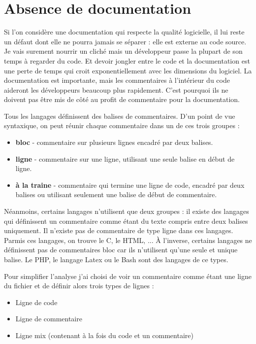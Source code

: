 \documentclass[10pt,a4paper,twoside, openany]{report}
\begin{document}
\section{Absence de documentation}

Si l'on consid\`ere une documentation qui respecte la qualit\'e logicielle, il lui reste un d\'efaut dont elle ne pourra jamais se s\'eparer : elle est externe au code source. Je vais surement nourrir un clich\'e mais un d\'eveloppeur passe la plupart de son temps \`a regarder du code. Et devoir jongler entre le code et la documentation est une perte de temps qui croit exponentiellement avec les dimensions du logiciel. La documentation est importante, mais les commentaires \`a l'int\'erieur du code aideront les d\'eveloppeurs beaucoup plus rapidement. C'est pourquoi ils ne doivent pas \^etre mis de c\^ot\'e au profit de commentaire pour la documentation.\newline

Tous les langages d\'efinissent des balises de commentaires. D'un point de vue syntaxique, on peut r\'eunir chaque commentaire dans un de ces trois groupes :

\begin{itemize}
\item{\textbf{bloc} - commentaire sur plusieurs lignes encadr\'e par deux balises.}
\item{\textbf{ligne} - commentaire sur une ligne, utilisant une seule balise en d\'ebut de ligne.}
\item{\textbf{\`a la traine} - commentaire qui termine une ligne de code, encadr\'e par deux balises ou utilisant seulement une balise de d\'ebut de commentaire.}
\end{itemize}

N\'eanmoins, certains langages n'utilisent que deux groupes : il existe des langages qui d\'efinissent un commentaire comme \'etant du texte compris entre deux balises uniquement. Il n'existe pas de commentaire de type ligne dans ces langages. Parmis ces langages, on trouve le C, le HTML, ... \`A l'inverse, certains langages ne d\'efinissent pas de commentaires bloc car ils n'utilisent qu'une seule et unique balise. Le PHP, le langage Latex ou le Bash sont des langages de ce types.

Pour simplifier l'analyse j'ai choisi de voir un commentaire comme \'etant une ligne du fichier et de d\'efinir alors trois types de lignes :

\begin{itemize}
\item{Ligne de code}
\item{Ligne de commentaire}
\item{Ligne mix (contenant \`a la fois du code et un commentaire)}
\end{itemize}
\end{document}
